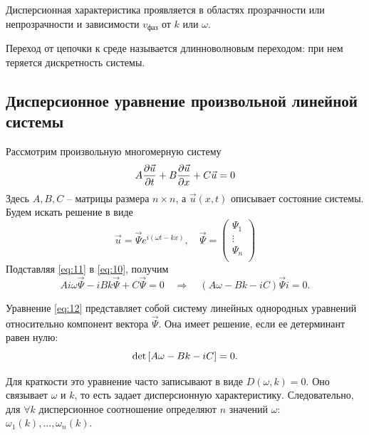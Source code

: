 Дисперсионная характеристика проявляется в областях прозрачности или непрозрачности и зависимости $v_\text{фаз}$ от $k$ или $\omega$.


Переход от цепочки к среде называется длинноволновым переходом: при нем теряется дискретность системы.




\subsection{Дисперсионное уравнение произвольной линейной системы}

Рассмотрим произвольную многомерную систему
\begin{equation}
	A\pdv{\vec{u}}{t}+B\pdv{\vec{u}}{x}+C\vec{u}=0
	\label{eq:10}
\end{equation}
Здесь $A, B, C$ --  матрицы размера $n\times n$, а $\vec{u}(x,t)$ описывает состояние системы. Будем искать решение в виде
\begin{equation}
	\vec{u}=\vec{\Psi} e^{i(\omega t - kx)}, \quad
	\vec\Psi=
	\begin{pmatrix}
		\Psi_1 \\
		\vdots \\
		\Psi_n \\
	\end{pmatrix}
	\label{eq:11}
\end{equation}
Подставляя \eqref{eq:11} в \eqref{eq:10}, получим
\begin{equation}
	Ai\omega\vec\Psi-iBk\vec\Psi+C\vec\Psi=0
	\quad \Rightarrow \quad
	(A\omega-Bk-iC)\vec\Psi i=0.
	\label{eq:12}
\end{equation}

Уравнение \eqref{eq:12} представляет собой систему линейных однородных уравнений относительно компонент вектора $\vec\Psi$. Она имеет решение, если ее детерминант равен нулю:
\begin{equation}
	\det\qty[A\omega-Bk-iC]=0.
	\label{eq:13}
\end{equation}

Для краткости это уравнение часто записывают в виде $D(\omega,k)=0$. Оно связывает $\omega$ и $k$, то есть задает дисперсионную характеристику. Следовательно, для $\forall k$ дисперсионное соотношение определяют $n$ значений $\omega$: $\omega_1(k), \dots, \omega_n(k)$. 

